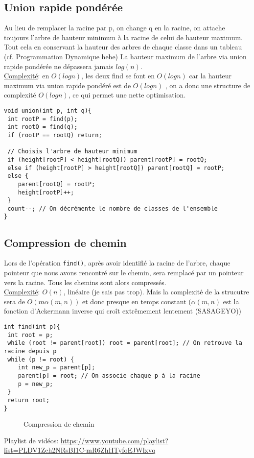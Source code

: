 \documentclass[10pt]{article}
\begin{document}
\subsection{Union rapide pondérée}
Au lieu de remplacer la racine par p, on change q en la racine, on attache toujours l'arbre de hauteur minimum à la racine de celui de hauteur maximum. Tout cela en conservant la hauteur des arbres de chaque classe dans un tableau (cf. Programmation Dynamique hehe) La hauteur maximum de l'arbre via union rapide pondérée ne dépassera jamais $log(n)$.
\\\underline{Complexité}: en $O(log n)$, les deux find se font en $O(log n)$ car la hauteur maximum via union rapide pondéré est de $O(log n)$ , on a donc une structure de complexité $O(log n)$, ce qui permet une nette optimisation.
\begin{verbatim}
void union(int p, int q){
 int rootP = find(p);
 int rootQ = find(q);
 if (rootP == rootQ) return;
 
 // Choisis l'arbre de hauteur minimum
 if (height[rootP] < height[rootQ]) parent[rootP] = rootQ;
 else if (height[rootP] > height[rootQ]) parent[rootQ] = rootP;
 else {
	parent[rootQ] = rootP;
	height[rootP]++;
 }
 count--; // On décrémente le nombre de classes de l'ensemble
}
\end{verbatim}

\subsection{Compression de chemin}
Lors de l'opération \verb|find()|, après avoir identifié la racine de l'arbre, chaque pointeur que nous avons rencontré sur le chemin, sera remplacé par un pointeur vers la racine. Tous les chemins sont alors compressés.
\\\underline{Complexité}: $O(n)$, linéaire (je sais pas trop). Mais la complexité de la strucutre sera de $O(m\alpha(m, n))$ et donc presque en temps constant ($\alpha(m, n)$ est la fonction d'Ackermann inverse qui croît extrêmement lentement (SASAGEYO))

\begin{verbatim}
int find(int p){
 int root = p;
 while (root != parent[root]) root = parent[root]; // On retrouve la racine depuis p
 while (p != root) {
 	int new_p = parent[p];
 	parent[p] = root; // On associe chaque p à la racine
 	p = new_p;
 }
 return root;
}
\end{verbatim}

\begin{figure}[H]
\caption{Compression de chemin}
\label{fig:Path_compression}
\end{figure}
Playlist de vidéos: \url{https://www.youtube.com/playlist?list=PLDV1Zeh2NRsBI1C-mR6ZhHTyfoEJWlxvq} 
\end{document}
